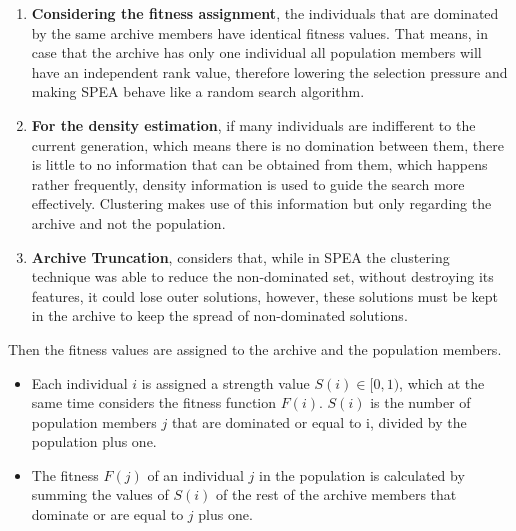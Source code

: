 \begin{enumerate}
    \item \textbf{Considering the fitness assignment}, the individuals that are dominated by the same archive members have identical fitness values. That means, in case that the archive has only one individual all population members will have an independent rank value, therefore lowering the selection pressure and making SPEA behave like a random search algorithm.
    \item \textbf{For the density estimation}, if many individuals are indifferent to the current generation, which means there is no domination between them, there is little to no information that can be obtained from them, which happens rather frequently, density information is used to guide the search more effectively. Clustering makes use of this information but only regarding the archive and not the population.
    \item \textbf{Archive Truncation}, considers that, while in SPEA the clustering technique was able to reduce the non-dominated set, without destroying its features, it could lose outer solutions, however, these solutions must be kept in the archive to keep the spread of non-dominated solutions.
\end{enumerate}


Then the fitness values are assigned to the archive and the population members. 
\begin{itemize}
    \item Each individual $i$ is assigned a strength value $S(i) \in [0, 1)$, which  at the same time considers the fitness function $F(i)$. $S(i)$ is the number of population members $j$ that are dominated or equal to i, divided by the population plus one.
    \item The fitness $F(j)$ of an individual $j$ in the population is calculated by summing the values of $S(i)$ of the rest of the archive members that dominate or are equal to $j$ plus one.
\end{itemize}


